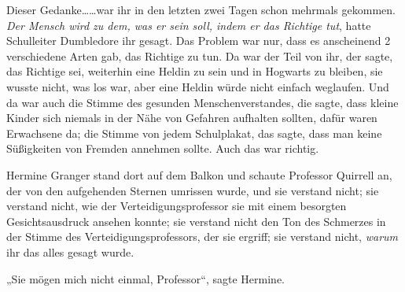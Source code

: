 

Dieser Gedanke……war ihr in den letzten zwei Tagen schon mehrmals gekommen. \emph{Der Mensch wird zu dem, was er sein soll, indem er das Richtige tut}, hatte Schulleiter Dumbledore ihr gesagt. Das Problem war nur, dass es anscheinend 2 verschiedene Arten gab, das Richtige zu tun. Da war der Teil von ihr, der sagte, das Richtige sei, weiterhin eine Heldin zu sein und in Hogwarts zu bleiben, sie wusste nicht, was los war, aber eine Heldin würde nicht einfach weglaufen.
%
Und da war auch die Stimme des gesunden Menschenverstandes, die sagte, dass kleine Kinder sich niemals in der Nähe von Gefahren aufhalten sollten, dafür waren Erwachsene da; die Stimme von jedem Schulplakat, das sagte, dass man keine Süßigkeiten von Fremden annehmen sollte. Auch das war richtig.

Hermine Granger stand dort auf dem Balkon und schaute Professor Quirrell an, der von den aufgehenden Sternen umrissen wurde, und sie verstand nicht; sie verstand nicht, wie der Verteidigungsprofessor sie mit einem besorgten Gesichtsausdruck ansehen konnte; sie verstand nicht den Ton des Schmerzes in der Stimme des Verteidigungsprofessors, der sie ergriff; sie verstand nicht, \emph{warum} ihr das alles gesagt wurde.

„Sie mögen mich nicht einmal, Professor“, sagte Hermine.


